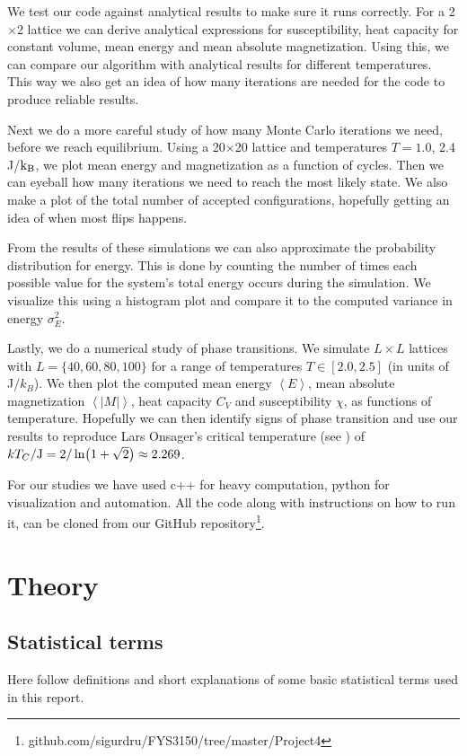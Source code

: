 \documentclass[reprint, english,notitlepage,nofootinbib]{revtex4-1}  %
\begin{document}
We test our code against analytical results to make sure it runs correctly. For a 2$\times$2 lattice we can derive analytical expressions for susceptibility, heat capacity for constant volume, mean energy and mean absolute magnetization. Using this, we can compare our algorithm with analytical results for different temperatures. This way we also get an idea of how many iterations are needed for the code to produce reliable results.

Next we do a more careful study of how many Monte Carlo iterations we need, before we reach equilibrium. Using a 20$\times$20 lattice and temperatures $T = 1.0$, 2.4 J/$\rm k_B$, we plot mean energy and magnetization as a function of cycles. Then we can eyeball how many iterations we need to reach the most likely state. We also make a plot of the total number of accepted configurations, hopefully getting an idea of when most flips happens.

From the results of these simulations we can also approximate the probability distribution for energy. This is done by counting the number of times each possible value for the system's total energy occurs during the simulation. We visualize this using a histogram plot and compare it to the computed variance in energy $\sigma_E^2$.

Lastly, we do a numerical study of phase transitions. We simulate $L \times L$ lattices with $L = \{40, 60, 80, 100\}$ for a range of temperatures $T\in[2.0,2.5]$ (in units of J/$k_B$). We then plot the computed mean energy $\left<E\right>$, mean absolute magnetization $\left<|M|\right>$, heat capacity $C_V$ and susceptibility $\chi$, as functions of temperature. Hopefully we can then identify signs of phase transition and use our results to reproduce Lars Onsager's critical temperature (see \cite{larsonsager}) of $kT_C/\rm{J}=2/\ln(1+\sqrt{2})\approx2.269$.

For our studies we have used c++ for heavy computation, python for visualization and automation. All the code along with instructions on how to run it, can be cloned from our GitHub repository\footnote{github.com/sigurdru/FYS3150/tree/master/Project4}.

\section{Theory}

\subsection*{Statistical terms}
Here follow definitions and short explanations of some basic statistical terms used in this report.
\end{document}
